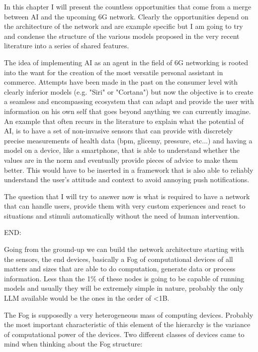

In this chapter I will present the countless opportunities that come from a merge between AI and the
upcoming 6G network. Clearly the opportunities depend on the architecture of the network and are
example specific but I am going to try and condense the structure of the various models proposed in the very recent literature into a series of shared features.

The idea of implementing AI as an agent in the field of 6G networking is rooted into the want for
the creation of the most versatile personal assistant in commerce. Attempts have been made in the
past on the consumer level with clearly inferior models (e.g. "Siri" or "Cortana") but now the
objective is to create a seamless and encompassing ecosystem that can adapt and provide the user
with information on his own self that goes beyond anything we can currently imagine. An example that
often recurs in the literature to explain what the potential of AI, is to have a set of non-invasive sensors that can provide with discretely precise measurements of health data (bpm,
glicemy, pressure, etc...) and having a model on a device, like a smartphone, that is able to understand
whether the values are in the norm and eventually provide pieces of advice to make them better. This would have
to be inserted in a framework that is also able to reliably understand the user's attitude and
context to avoid annoying push notifications.

The question that I will try to answer now is what is required to have a network that can handle
users, provide them with very custom experiences and react to situations and stimuli automatically
without the need of human intervention.

\bigskip
\noindent
END:
\label{ssec:end}

Going from the ground-up we can build the network architecture starting with the sensors, the end
devices, basically a Fog of computational devices of all matters and sizes that are able to do
computation, generate data or process information. Less than the 1\% of these nodes is going to be
capable of running models and usually they will be extremely simple in nature, probably the only LLM
available would be the ones in the order of <1B.

The Fog is supposedly a very heterogeneous mass of computing devices. Probably the most important
characteristic of this element of the hierarchy is the variance of computational power of the
devices. Two different classes of devices came to mind when thinking about the Fog structure:

